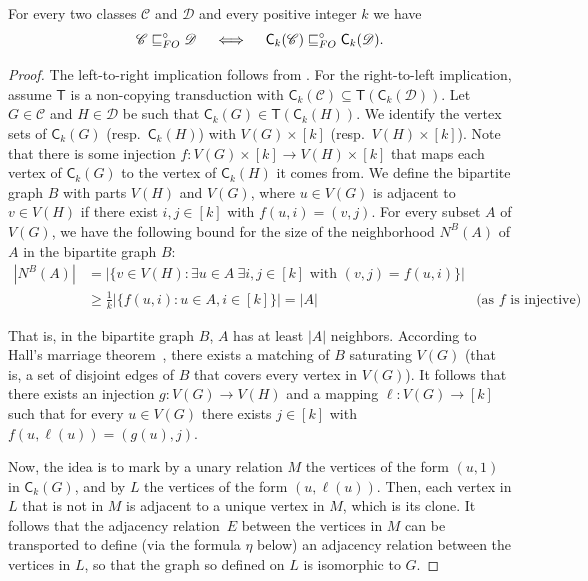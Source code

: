 \documentclass{lmcs}
\newcommand{\Cc}{\mathscr{C}}
\newcommand{\Dd}{\mathscr{D}}
\renewcommand{\FO}{{\rm FO}}
\theoremstyle{definition}
\begin{document}
\begin{lem}
	\label{lem:cancel_copy}
	For every two classes $\Cc$ and $\Dd$ and every positive integer $k$ we have
	\[
	\Cc\sqsubseteq_\FO^\circ\Dd\quad\iff\quad\mathsf C_k(\Cc)\sqsubseteq_\FO^\circ\mathsf C_k(\Dd).
	\]
\end{lem}
\begin{proof}
	The left-to-right implication follows from .
	For the right-to-left implication, assume $\mathsf T$ is a non-copying transduction with $\mathsf C_k(\Cc)\subseteq\mathsf T(\mathsf C_k(\Dd))$.
	Let $G\in\Cc$ and $H\in\Dd$ be such that $\mathsf C_k(G)\in\mathsf T(\mathsf C_k(H))$. We identify the vertex sets of $\mathsf C_k(G)$ (resp.\ $\mathsf C_k(H)$) with $V(G)\times [k]$ (resp.\ $V(H)\times [k]$). Note that there is some injection $f:V(G)\times [k]\rightarrow V(H)\times[k]$ that maps each vertex of $\mathsf C_k(G)$ to the vertex of $\mathsf C_k(H)$ it comes from.
	We define the bipartite graph $B$ with parts $V(H)$ and $V(G)$, where $u\in V(G)$ is adjacent to $v\in V(H)$ if there exist $i,j\in[k]$ with $f(u,i)=(v,j)$. For every subset $A$ of $V(G)$, we have the following bound for the size of the neighborhood $N^B(A)$ of $A$ in the bipartite graph $B$:
	\begin{align*}
	|N^B(A)|&=|\{v\in V(H)\colon \exists u\in A\ \exists i,j\in [k]\text{ with }(v,j)=f(u,i)\}|\\
	&\geq\frac{1}{k}|\{f(u,i)\colon u\in A, i\in [k]\}|=|A|&\text{(as $f$ is injective)}.
	\end{align*}

	That is, in the bipartite graph $B$, $A$ has at least $|A|$ neighbors. According to Hall's marriage theorem~\cite[Theorem 2.1.2]{diestel2012graph}, there exists a matching of $B$ saturating $V(G)$ (that is, a set of disjoint edges of $B$ that covers every vertex in $V(G)$). It follows that there exists an injection $g:V(G)\rightarrow V(H)$ and a mapping $\ell:V(G)\rightarrow[k]$ such that for every $u\in V(G)$ there exists $j\in[k]$ with $f(u,\ell(u))=(g(u),j)$. 
	
	Now, the idea is to mark by a unary relation $M$ the vertices of the form $(u,1)$ in $\mathsf C_k(G)$, and by $L$ the vertices of the form $(u,\ell(u))$. Then, each vertex in $L$ that is not in $M$ is adjacent to a unique vertex in $M$, which is its clone.
	It follows that the adjacency relation~$E$ between the vertices in $M$ can be transported to define (via the formula $\eta$ below) an adjacency relation between the vertices in $L$, so that the graph so defined on $L$ is isomorphic to $G$.
	

\end{proof}
\end{document}
